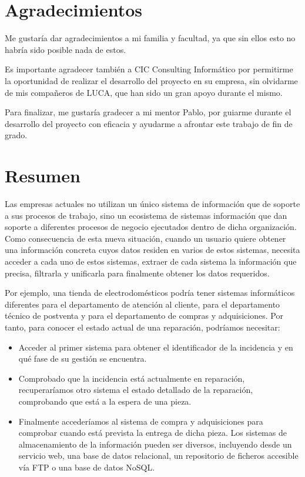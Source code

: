 \chapter*{Agradecimientos}
	Me gustaría dar agradecimientos a mi familia y facultad, ya que sin ellos esto no habría sido posible nada de estos.
	
	 Es importante agradecer también a CIC Consulting Informático por permitirme la oportunidad de realizar el desarrollo del proyecto en su empresa, sin olvidarme de mis compañeros de LUCA, que han sido un gran apoyo durante el mismo.
	
	 Para finalizar, me gustaría gradecer a mi mentor Pablo, por guiarme durante el desarrollo del proyecto con eficacia y ayudarme a afrontar este trabajo de fin de grado.

	
	\chapter*{Resumen}
	Las empresas actuales no utilizan un único sistema de información que de soporte a sus procesos de trabajo, sino un  ecosistema de sistemas información que dan soporte a diferentes procesos de negocio ejecutados dentro de dicha organización. Como consecuencia de esta nueva situación, cuando un usuario	quiere obtener una información concreta cuyos datos residen en varios de estos
	sistemas, necesita acceder a cada uno de estos sistemas, extraer de cada sistema la información que precisa, filtrarla y unificarla para finalmente	obtener los datos requeridos.
	
	
	Por ejemplo, una tienda de electrodomésticos podría tener sistemas informáticos diferentes para el departamento de atención al cliente, para el departamento técnico de postventa y para el departamento de compras y adquisiciones. Por tanto, para conocer el estado actual de una reparación, podríamos necesitar:
		\begin{itemize}
			\item  Acceder al primer sistema para obtener el identificador de la incidencia y en qué fase de su gestión se encuentra.
			\item  Comprobado que la incidencia está actualmente en reparación, recuperaríamos otro sistema el estado detallado de la reparación, comprobando que está a la espera de una pieza.
			\item Finalmente accederíamos al sistema de compra y adquisiciones para comprobar cuando está prevista la entrega de dicha pieza. Los sistemas de almacenamiento de la información pueden ser diversos, incluyendo desde un servicio web, una base de datos relacional, un repositorio de ficheros accesible vía FTP o una base de datos NoSQL.
		\end{itemize}
	
